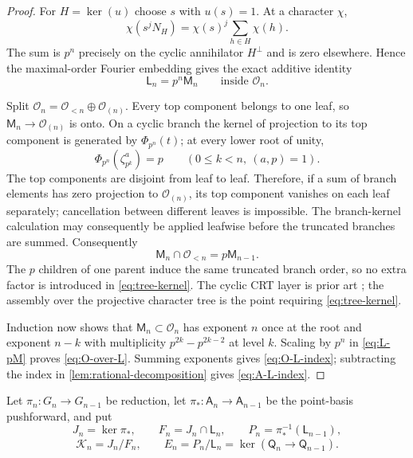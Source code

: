\documentclass[12pt,a4paper]{article}
\theoremstyle{definition}
\newcommand{\A}{\mathsf A}
\newcommand{\OO}{\mathcal O}
\newcommand{\LL}{\mathsf L}
\newcommand{\QQ}{\mathsf Q}
\begin{document}
\begin{proof}
For $H=\ker(u)$ choose $s$ with $u(s)=1$.  At a character $\chi$,
\[
 \chi(s^jN_H)=\chi(s)^j\sum_{h\in H}\chi(h).
\]
The sum is $p^n$ precisely on the cyclic annihilator $H^\perp$ and is zero
elsewhere.  Hence the maximal-order Fourier embedding gives the exact
additive identity
\begin{equation}\label{eq:L-pM}
 \LL_n=p^n\mathsf M_n\qquad\text{inside }\OO_n.
\end{equation}

Split $\OO_n=\OO_{<n}\oplus\OO_{(n)}$.  Every top component belongs to one
leaf, so $\mathsf M_n\to\OO_{(n)}$ is onto.  On a cyclic branch the kernel of
projection to its top component is generated by $\Phi_{p^n}(t)$; at every
lower root of unity,
\[
 \Phi_{p^n}(\zeta_{p^k}^a)=p\qquad(0\leq k<n,\ (a,p)=1).
\]
The top components are disjoint from leaf to leaf.  Therefore, if a sum of
branch elements has zero projection to $\OO_{(n)}$, its top component
vanishes on each leaf separately; cancellation between different leaves is
impossible.  The branch-kernel calculation may consequently be applied
leafwise before the truncated branches are summed.
Consequently
\begin{equation}\label{eq:tree-kernel}
 \mathsf M_n\cap\OO_{<n}=p\mathsf M_{n-1}.
\end{equation}
The $p$ children of one parent induce the same truncated branch order, so no
extra factor is introduced in \eqref{eq:tree-kernel}.  The cyclic CRT layer
is prior art \cite[Theorem~2.6 and Lemma~2.5]{MS15}; the assembly over the
projective character tree is the point requiring \eqref{eq:tree-kernel}.

Induction now shows that $\mathsf M_n\subset\OO_n$ has exponent $n$ once at
the root and exponent $n-k$ with multiplicity
$p^{2k}-p^{2k-2}$ at level $k$.  Scaling by $p^n$ in
\eqref{eq:L-pM} proves \eqref{eq:O-over-L}.  Summing exponents gives
\eqref{eq:O-L-index}; subtracting the index in \cref{lem:rational-decomposition} gives
\eqref{eq:A-L-index}.
\end{proof}

Let $\pi_n:G_n\to G_{n-1}$ be reduction, let
$\pi_*:\A_n\to\A_{n-1}$ be the point-basis pushforward, and put
\[
 J_n=\ker\pi_*,\qquad F_n=J_n\cap\LL_n,
 \qquad P_n=\pi_*^{-1}(\LL_{n-1}),
\]
\[
 \mathcal K_n=J_n/F_n,
 \qquad E_n=P_n/\LL_n=\ker(\QQ_n\to\QQ_{n-1}).
\]
\end{document}
